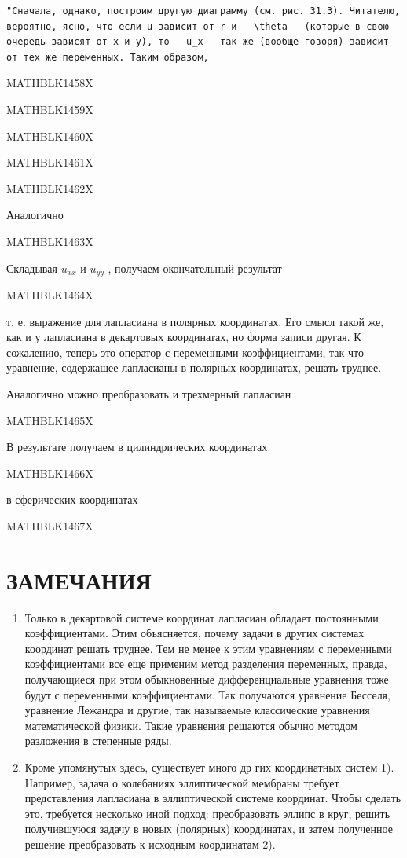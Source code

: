 \documentclass[
]{article}
\begin{document}
\begin{verbatim}
"Сначала, однако, построим другую диаграмму (см. рис. 31.3). Читателю, вероятно, ясно, что если u зависит от r и   \theta   (которые в свою очередь зависят от x и y), то   u_x   так же (вообще говоря) зависит от тех же переменных. Таким образом,
\end{verbatim}

MATHBLK1458X

MATHBLK1459X

MATHBLK1460X

MATHBLK1461X

MATHBLK1462X

Аналогично

MATHBLK1463X

Складывая \(u_{xx}\) и \(u_{yy}\) , получаем окончательный результат

MATHBLK1464X

т. е. выражение для лапласиана в полярных координатах. Его смысл такой
же, как и у лапласиана в декартовых координатах, но форма записи другая.
К сожалению, теперь это оператор с переменными коэффициентами, так что
уравнение, содержащее лапласианы в полярных координатах, решать труднее.

Аналогично можно преобразовать и трехмерный лапласиан

MATHBLK1465X

В результате получаем в цилиндрических координатах

MATHBLK1466X

в сферических координатах

MATHBLK1467X

\section{ЗАМЕЧАНИЯ}\label{ux437ux430ux43cux435ux447ux430ux43dux438ux44f-12}

\begin{enumerate}
\def\labelenumi{\arabic{enumi}.}
\item
  Только в декартовой системе координат лапласиан обладает постоянными
  коэффициентами. Этим объясняется, почему задачи в других системах
  координат решать труднее. Тем не менее к этим уравнениям с переменными
  коэффициентами все еще применим метод разделения переменных, правда,
  получающиеся при этом обыкновенные дифференциальные уравнения тоже
  будут с переменными коэффициентами. Так получаются уравнение Бесселя,
  уравнение Лежандра и другие, так называемые классические уравнения
  математической физики. Такие уравнения решаются обычно методом
  разложения в степенные ряды.
\item
  Кроме упомянутых здесь, существует много др гих координатных систем
  1). Например, задача о колебаниях эллиптической мембраны требует
  представления лапласиана в эллиптической системе координат. Чтобы
  сделать это, требуется несколько иной подход: преобразовать эллипс в
  круг, решить получившуюся задачу в новых (полярных) координатах, и
  затем полученное решение преобразовать к исходным координатам 2).
\end{enumerate}
\end{document}
